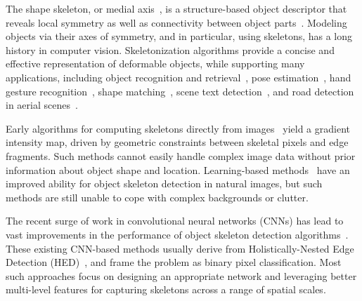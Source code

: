 \documentclass[10pt,twocolumn,letterpaper]{article}
\begin{document}
The shape skeleton, or medial axis~\cite{blum1973biological}, is a structure-based object descriptor that reveals local symmetry as well as connectivity between object parts~\cite{marr1978representation,dickinson2009object}. Modeling
objects via their axes of symmetry, and in particular, using skeletons,
has a long history in computer vision. Skeletonization algorithms
provide a concise and effective
representation of deformable objects, while supporting many applications,
including object recognition and retrieval~\cite{zhu1996forms,felzenszwalb2005pictorial,bai2009active,trinh2011skeleton}, pose estimation~\cite{girshick2011efficient,shotton2011real,wei2016convolutional}, hand gesture recognition~\cite{ren2013robust}, shape matching~\cite{siddiqi1999shock}, scene text detection~\cite{zhang2015symmetry},
and road detection in aerial scenes~\cite{sironi2014multiscale}.


Early algorithms for computing skeletons directly from images~\cite{lindeberg1998edge,liu1998segmenting,jang2001pseudo,yu2004segmentation,nedzved2006gray,zhang2007accurate,lindeberg2013scale} yield a gradient intensity map, driven by geometric constraints between skeletal pixels and edge fragments. Such methods cannot easily handle complex image data without prior information about object shape and location. Learning-based methods~\cite{levinshtein2013multiscale,sie2013detecting,tsogkas2012mil,shen2016misl,sironi2014multiscale} have an improved ability for object skeleton detection in natural images, but such methods are still unable to cope with complex backgrounds or clutter.

The recent surge of work in convolutional neural networks (CNNs) has lead to vast improvements in the performance of object skeleton detection algorithms~\cite{shen2016fsds,shen2017lmsds,ke2017srn,liu2017twostream,zhao2018hifi,liu2018lsn}. These existing CNN-based methods usually derive from Holistically-Nested Edge Detection (HED)~\cite{xie2015hed}, and frame the problem as binary pixel classification.
Most such approaches focus on designing an appropriate network and leveraging better multi-level features for capturing skeletons across a range of spatial scales.
\end{document}
